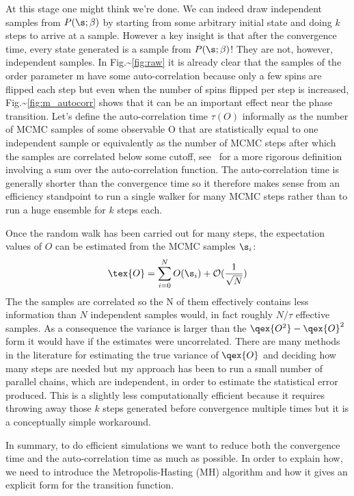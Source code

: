 At this stage one might think we're done. We can indeed draw independent samples from \(P(\s; \beta)\) by starting from some arbitrary initial state and doing \(k\) steps to arrive at a sample. However a key insight is that after the convergence time, every state generated is a sample from \(P(\s; \beta)\)! They are not, however, independent samples. In Fig.\textasciitilde{}\ref{fig:raw} it is already clear that the samples of the order parameter m have some auto-correlation because only a few spins are flipped each step but even when the number of spins flipped per step is increased, Fig.\textasciitilde{}\ref{fig:m_autocorr} shows that it can be an important effect near the phase transition. Let's define the auto-correlation time \(\tau(O)\) informally as the number of MCMC samples of some observable O that are statistically equal to one independent sample or equivalently as the number of MCMC steps after which the samples are correlated below some cutoff, see~\autocite{krauthIntroductionMonteCarlo1996} for a more rigorous definition involving a sum over the auto-correlation function. The auto-correlation time is generally shorter than the convergence time so it therefore makes sense from an efficiency standpoint to run a single walker for many MCMC steps rather than to run a huge ensemble for \(k\) steps each.

Once the random walk has been carried out for many steps, the expectation values of \(O\) can be estimated from the MCMC samples \(\s_i\): \[
    \tex{O} = \sum_{i = 0}^{N} O(\s_i) + \mathcal{O}(\frac{1}{\sqrt{N}})
\] The the samples are correlated so the N of them effectively contains less information than \(N\) independent samples would, in fact roughly \(N/\tau\) effective samples. As a consequence the variance is larger than the \(\qex{O^2} - \qex{O}^2\) form it would have if the estimates were uncorrelated. There are many methods in the literature for estimating the true variance of \(\qex{O}\) and deciding how many steps are needed but my approach has been to run a small number of parallel chains, which are independent, in order to estimate the statistical error produced. This is a slightly less computationally efficient because it requires throwing away those \(k\) steps generated before convergence multiple times but it is a conceptually simple workaround.

In summary, to do efficient simulations we want to reduce both the convergence time and the auto-correlation time as much as possible. In order to explain how, we need to introduce the Metropolis-Hasting (MH) algorithm and how it gives an explicit form for the transition function.

